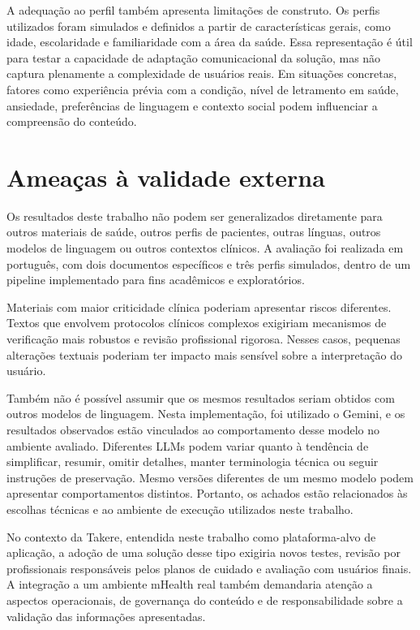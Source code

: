 A adequação ao perfil também apresenta limitações de construto. Os perfis utilizados foram simulados e definidos a partir de características gerais, como idade, escolaridade e familiaridade com a área da saúde. Essa representação é útil para testar a capacidade de adaptação comunicacional da solução, mas não captura plenamente a complexidade de usuários reais. Em situações concretas, fatores como experiência prévia com a condição, nível de letramento em saúde, ansiedade, preferências de linguagem e contexto social podem influenciar a compreensão do conteúdo.

\section{Ameaças à validade externa}
\label{sec:ameacas-validade-externa}

Os resultados deste trabalho não podem ser generalizados diretamente para outros materiais de saúde, outros perfis de pacientes, outras línguas, outros modelos de linguagem ou outros contextos clínicos. A avaliação foi realizada em português, com dois documentos específicos e três perfis simulados, dentro de um pipeline implementado para fins acadêmicos e exploratórios.

Materiais com maior criticidade clínica poderiam apresentar riscos diferentes. Textos que envolvem protocolos clínicos complexos exigiriam mecanismos de verificação mais robustos e revisão profissional rigorosa. Nesses casos, pequenas alterações textuais poderiam ter impacto mais sensível sobre a interpretação do usuário.

Também não é possível assumir que os mesmos resultados seriam obtidos com outros modelos de linguagem. Nesta implementação, foi utilizado o Gemini, e os resultados observados estão vinculados ao comportamento desse modelo no ambiente avaliado. Diferentes LLMs podem variar quanto à tendência de simplificar, resumir, omitir detalhes, manter terminologia técnica ou seguir instruções de preservação. Mesmo versões diferentes de um mesmo modelo podem apresentar comportamentos distintos. Portanto, os achados estão relacionados às escolhas técnicas e ao ambiente de execução utilizados neste trabalho.

No contexto da Takere, entendida neste trabalho como plataforma-alvo de aplicação, a adoção de uma solução desse tipo exigiria novos testes, revisão por profissionais responsáveis pelos planos de cuidado e avaliação com usuários finais. A integração a um ambiente mHealth real também demandaria atenção a aspectos operacionais, de governança do conteúdo e de responsabilidade sobre a validação das informações apresentadas.

